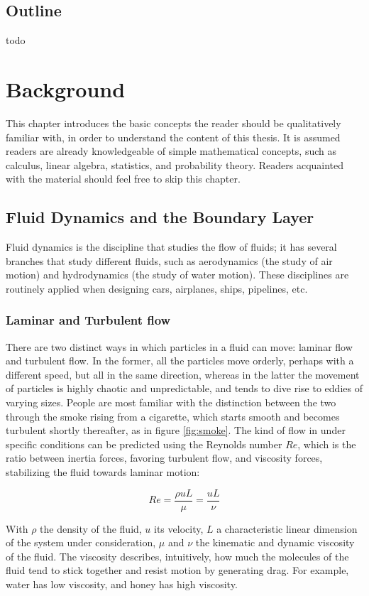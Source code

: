 \documentclass[12pt]{book}
\begin{document}
\section{Outline}
todo

\chapter{Background}
This chapter introduces the basic concepts the reader should be qualitatively familiar with, in order to understand the content of this thesis. It is assumed readers are already knowledgeable of simple mathematical concepts, such as calculus, linear algebra, statistics, and probability theory. Readers acquainted with the material should feel free to skip this chapter.

\section{Fluid Dynamics and the Boundary Layer}
Fluid dynamics is the discipline that studies the flow of fluids; it has several branches that study different fluids, such as aerodynamics (the study of air motion) and hydrodynamics (the study of water motion). These disciplines are routinely applied when designing cars, airplanes, ships, pipelines, etc.

\subsection{Laminar and Turbulent flow}
There are two distinct ways in which particles in a fluid can move: laminar flow and turbulent flow. In the former, all the particles move orderly, perhaps with a different speed, but all in the same direction, whereas in the latter the movement of particles is highly chaotic and unpredictable, and tends to dive rise to eddies of varying sizes. People are most familiar with the distinction between the two through the smoke rising from a cigarette, which starts smooth and becomes turbulent shortly thereafter, as in figure \ref{fig:smoke}. The kind of flow in under specific conditions can be predicted using the Reynolds number $Re$, which is the ratio between inertia forces, favoring turbulent flow, and viscosity forces, stabilizing the fluid towards laminar motion:

$$
Re=\frac{\rho u L}{\mu}=\frac{uL}{\nu}
$$

With $\rho$ the density of the fluid, $u$ its velocity, $L$ a characteristic linear dimension of the system under consideration, $\mu$ and $\nu$ the kinematic and dynamic viscosity of the fluid. The viscosity describes, intuitively, how much the molecules of the fluid tend to stick together and resist motion by generating drag. For example, water has low viscosity, and honey has high viscosity.
\end{document}
